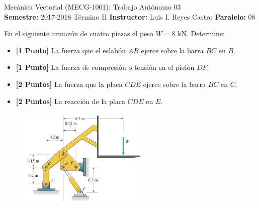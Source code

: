 \documentclass[ a4paper, twoside, 11pt]{article}
\newcommand{\numero}{03}
\begin{document}
\allowdisplaybreaks

\begin{center}
\Large Mec\'anica Vectorial (MECG-1001): Trabajo Aut\'onomo \numero \\[2ex]
\small \textbf{Semestre:} 2017-2018 T\'ermino II \qquad
\textbf{Instructor:} Luis I. Reyes Castro \qquad
\textbf{Paralelo:} 08
\end{center}
\fullskip

\begin{problem}
En el siguiente armaz\'on de cuatro piezas el peso $W = 8$ kN. Determine: 
\begin{itemize}
\item \textbf{[1 Punto]} La fuerza que el eslab\'on $AB$ ejerce sobre la barra $BC$ en $B$. 
\item \textbf{[1 Punto]} La fuerza de compresi\'on o tensi\'on en el pist\'on $DF$. 
\item \textbf{[2 Puntos]} La fuerza que la placa $CDE$ ejerce sobre la barra $BC$ en $C$. 
\item \textbf{[2 Puntos]} La reacci\'on de la placa $CDE$ en $E$. 
\end{itemize}

\begin{figure}[htb]
\centering
\includegraphics[width=0.56\textwidth]{problema-1.jpg}
\end{figure}

\end{problem}
\fullskip
\fullskip
\end{document}
